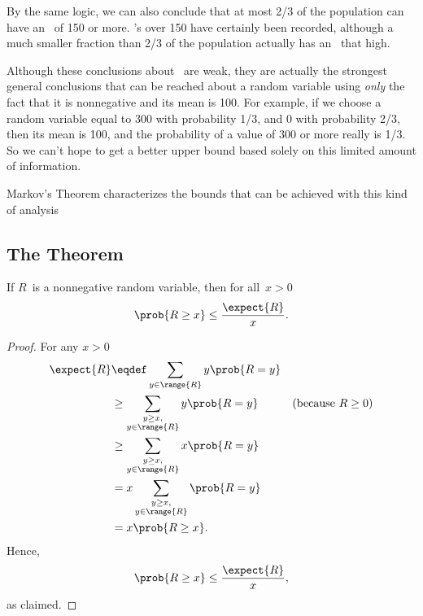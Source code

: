 By the same logic, we can also conclude that at most 2/3 of the
population can have an \IQ\ of 150 or more.  \IQ's over 150 have
certainly been recorded, although a much smaller fraction than 2/3 of
the population actually has an \IQ\ that high.

Although these conclusions about \IQ\ are weak, they are actually the
strongest general conclusions that can be reached about a random
variable using \emph{only} the fact that it is nonnegative and its
mean is 100.  For example, if we choose a random variable equal to 300
with probability 1/3, and 0 with probability 2/3, then its mean is
100, and the probability of a value of 300 or more really is 1/3.  So
we can't hope to get a better upper bound based solely on this limited
amount of information.

Markov's Theorem characterizes the bounds that can be achieved with
this kind of analysis

\subsection{The Theorem}

\begin{theorem}\label{thm:markov}
  If $R$~is a nonnegative random variable, then for all~$x > 0$
  \begin{equation*}
    \prob{R \geq x} \leq \frac{\expect{R}}{x}.
  \end{equation*}
\end{theorem}

\begin{proof}%
For any $x > 0$
\begin{align}
  \expect{R}
  & \eqdef \sum_{y \in \range{R}} y\prob{R=y}\notag\\
  & \geq \sum_{\substack{y \geq x,\\ y \in \range{R}}} y\prob{R=y} & \text{(because $R \geq 0$)}\notag\\
  & \geq \sum_{\substack{y \geq x,\\ y \in \range{R}}} x\prob{R=y}\notag\\
  & = x \sum_{\substack{y \geq x,\\ y \in \range{R}}} \prob{R=y}\notag\\
  & = x \prob{R \geq x}.\label{markovproof}
\end{align}
Hence,
\begin{equation*}
    \prob{R \ge x} \le \frac{\expect{R}}{x},
\end{equation*}
as claimed.
\end{proof}

